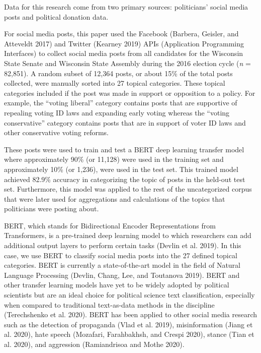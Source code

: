 \documentclass[12pt,]{article}
\begin{document}
Data for this research come from two primary sources: politicians'
social media posts and political donation data.

For social media posts, this paper used the Facebook (Barbera, Geisler,
and Atteveldt 2017) and Twitter (Kearney 2019) APIs (Application
Programming Interfaces) to collect social media posts from all
candidates for the Wisconsin State Senate and Wisconsin State Assembly
during the 2016 election cycle (\emph{n} = 82,851). A random subset of
12,364 posts, or about 15\% of the total posts collected, were manually
sorted into 27 topical categories. These topical categories included if
the post was made in support or opposition to a policy. For example, the
``voting liberal'' category contains posts that are supportive of
repealing voting ID laws and expanding early voting whereas the ``voting
conservative'' category contains posts that are in support of voter ID
laws and other conservative voting reforms.

These posts were used to train and test a BERT deep learning transfer
model where approximately 90\% (or 11,128) were used in the training set
and approximately 10\% (or 1,236), were used in the test set. This
trained model achieved 82.9\% accuracy in categorizing the topic of
posts in the held-out test set. Furthermore, this model was applied to
the rest of the uncategorized corpus that were later used for
aggregations and calculations of the topics that politicians were
posting about.

BERT, which stands for Bidirectional Encoder Representations from
Transformers, is a pre-trained deep learning model to which researchers
can add additional output layers to perform certain tasks (Devlin et al.
2019). In this case, we use BERT to classify social media posts into the
27 defined topical categories. BERT is currently a state-of-the-art
model in the field of Natural Language Processing (Devlin, Chang, Lee,
and Toutanova 2019). BERT and other transfer learning models have yet to
be widely adopted by political scientists but are an ideal choice for
political science text classification, especially when compared to
traditional text-as-data methods in the discipline (Terechshenko et al.
2020). BERT has been applied to other social media research such as the
detection of propaganda (Vlad et al. 2019), misinformation (Jiang et al.
2020), hate speech (Mozafari, Farahbakhsh, and Crespi 2020), stance
(Tian et al. 2020), and aggression (Ramiandrisoa and Mothe 2020).
\end{document}
